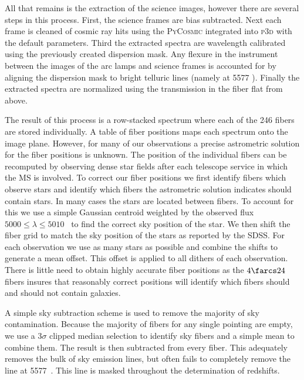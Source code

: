 All that remains is the extraction of the science images, however there are several steps in this process. First, the science frames are bias subtracted. Next each frame is cleaned of cosmic ray hits using the \textsc{PyCosmic} \citep{Husemann2012} integrated into \textsc{p3d} with the default parameters. Third the extracted spectra are wavelength calibrated using the previously created dispersion mask. Any flexure in the instrument between the images of the arc lamps and science frames is accounted for by aligning the dispersion mask to bright telluric lines (namely \hbox{} at 5577 \AAA). Finally the extracted spectra are normalized using the transmission in the fiber flat from above.

The result of this process is a row-stacked spectrum where each of the 246 fibers are stored individually. A table of fiber positions maps each spectrum onto the image plane. However, for many of our observations a precise astrometric solution for the fiber positions is unknown. The position of the individual fibers can be recomputed by observing dense star fields after each telescope service in which the MS is involved. To correct our fiber positions we first identify fibers which observe stars and identify which fibers the astrometric solution indicates should contain stars. In many cases the stars are located between fibers. To account for this we use a simple Gaussian centroid weighted by the observed flux $5000 \leq \lambda \leq 5010$ \AAA\ to find the correct sky position of the star. We then shift the fiber grid to match the sky position of the stars as reported by the SDSS. For each observation we use as many stars as possible and combine the shifts to generate a mean offset. This offset is applied to all dithers of each observation. There is little need to obtain highly accurate fiber positions as the $4\farcs24$ fibers insures that reasonably correct positions will identify which fibers should and should not contain galaxies.

A simple sky subtraction scheme is used to remove the majority of sky contamination. Because the majority of fibers for any single pointing are empty, we use a $3\sigma$ clipped median selection to identify sky fibers and a simple mean to combine them. The result is then subtracted from every fiber. This adequately removes the bulk of sky emission lines, but often fails to completely remove the \hbox{} line at 5577~\AAA. This line is masked throughout the determination of redshifts.

